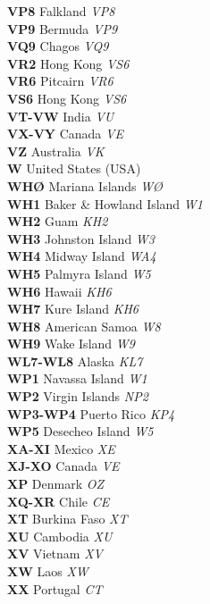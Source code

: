 \documentclass[landscape,a4paper]{article}
\begin{document}
\begin{multicols}{7}
\textbf{VP8} Falkland \emph{VP8} \\
\textbf{VP9} Bermuda \emph{VP9} \\
\textbf{VQ9} Chagos \emph{VQ9} \\
\textbf{VR2} Hong Kong \emph{VS6} \\
\textbf{VR6} Pitcairn \emph{VR6} \\
\textbf{VS6} Hong Kong \emph{VS6} \\
\textbf{VT-VW} India \emph{VU} \\
\textbf{VX-VY} Canada \emph{VE} \\
\textbf{VZ} Australia \emph{VK} \\
\textbf{W} United States (USA) \\
\textbf{WHØ} Mariana Islands \emph{WØ} \\
\textbf{WH1} Baker \& Howland Island \emph{W1} \\
\textbf{WH2} Guam \emph{KH2} \\
\textbf{WH3} Johnston Island \emph{W3} \\
\textbf{WH4} Midway Island \emph{WA4} \\
\textbf{WH5} Palmyra Island \emph{W5} \\
\textbf{WH6} Hawaii \emph{KH6} \\
\textbf{WH7} Kure Island \emph{KH6} \\
\textbf{WH8} American Samoa \emph{W8} \\
\textbf{WH9} Wake Island \emph{W9} \\
\textbf{WL7-WL8} Alaska \emph{KL7} \\
\textbf{WP1} Navassa Island \emph{W1} \\
\textbf{WP2} Virgin Islands \emph{NP2} \\
\textbf{WP3-WP4} Puerto Rico \emph{KP4} \\
\textbf{WP5} Desecheo Island \emph{W5} \\
\textbf{XA-XI} Mexico \emph{XE} \\
\textbf{XJ-XO} Canada \emph{VE} \\
\textbf{XP} Denmark \emph{OZ} \\
\textbf{XQ-XR} Chile \emph{CE} \\
\textbf{XT} Burkina Faso \emph{XT} \\
\textbf{XU} Cambodia \emph{XU} \\
\textbf{XV} Vietnam \emph{XV} \\
\textbf{XW} Laos \emph{XW} \\
\textbf{XX} Portugal \emph{CT} \\

\end{multicols}
\end{document}
